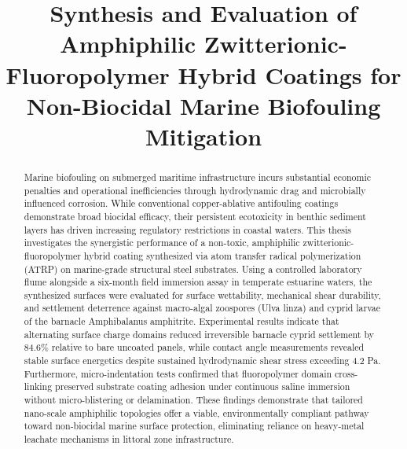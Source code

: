 \documentclass[oneside]{etd}
\title{Synthesis and Evaluation of Amphiphilic Zwitterionic-Fluoropolymer Hybrid Coatings for Non-Biocidal Marine Biofouling Mitigation}
\begin{document}
\maketitle


\begin{abstract}
	Marine biofouling on submerged maritime infrastructure incurs substantial economic penalties and operational inefficiencies through hydrodynamic drag and microbially influenced corrosion. While conventional copper-ablative antifouling coatings demonstrate broad biocidal efficacy, their persistent ecotoxicity in benthic sediment layers has driven increasing regulatory restrictions in coastal waters. This thesis investigates the synergistic performance of a non-toxic, amphiphilic zwitterionic-fluoropolymer hybrid coating synthesized via atom transfer radical polymerization (ATRP) on marine-grade structural steel substrates. Using a controlled laboratory flume alongside a six-month field immersion assay in temperate estuarine waters, the synthesized surfaces were evaluated for surface wettability, mechanical shear durability, and settlement deterrence against macro-algal zoospores (Ulva linza) and cyprid larvae of the barnacle Amphibalanus amphitrite. Experimental results indicate that alternating surface charge domains reduced irreversible barnacle cyprid settlement by 84.6\% relative to bare uncoated panels, while contact angle measurements revealed stable surface energetics despite sustained hydrodynamic shear stress exceeding 4.2 Pa. Furthermore, micro-indentation tests confirmed that fluoropolymer domain cross-linking preserved substrate coating adhesion under continuous saline immersion without micro-blistering or delamination. These findings demonstrate that tailored nano-scale amphiphilic topologies offer a viable, environmentally compliant pathway toward non-biocidal marine surface protection, eliminating reliance on heavy-metal leachate mechanisms in littoral zone infrastructure.
\end{abstract}

% 
% 

\begingroup
\renewcommand*{\addvspace}[1]{}
\tableofcontents
\listoffigures
\listoftables
\endgroup
\end{document}
